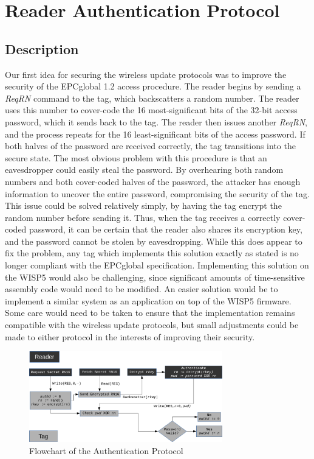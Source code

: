 \documentclass[journal]{IEEEtran}
\begin{document}
\section{Reader Authentication Protocol}
    \subsection{Description}
        Our first idea for securing the wireless update protocols was to improve the security of the EPCglobal 1.2 access procedure.
        The reader begins by sending a \textit{ReqRN} command to the tag, which backscatters a random number.
        The reader uses this number to cover-code the 16 most-significant bits of the 32-bit access password, which it sends back to the tag.
        The reader then issues another \textit{ReqRN}, and the process repeats for the 16 least-significant bits of the access password.
        If both halves of the password are received correctly, the tag transitions into the secure state.
        The most obvious problem with this procedure is that an eavesdropper could easily steal the password.
        By overhearing both random numbers and both cover-coded halves of the password, the attacker has enough information to uncover the entire password, compromising the security of the tag.
        This issue could be solved relatively simply, by having the tag encrypt the random number before sending it.
        Thus, when the tag receives a correctly cover-coded password, it can be certain that the reader also shares its encryption key, and the password cannot be stolen by eavesdropping.
        While this does appear to fix the problem, any tag which implements this solution exactly as stated is no longer compliant with the EPCglobal specification.
        Implementing this solution on the WISP5 would also be challenging, since significant amounts of time-sensitive assembly code would need to be modified.
        An easier solution would be to implement a similar system as an application on top of the WISP5 firmware.
        Some care would need to be taken to ensure that the implementation remains compatible with the wireless update protocols, but small adjustments could be made to either protocol in the interests of improving their security.
        \begin{figure}[!t]
            \centering
            \includegraphics[width=0.75\textwidth]{images/CRFID-Auth-Process.pdf}
            \caption{Flowchart of the Authentication Protocol}
            \label{proto-diag}
        \end{figure}
\end{document}
